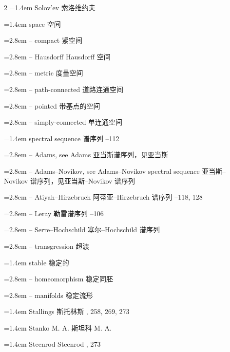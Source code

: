 \begin{multicols}{2}
\noindent\hangindent=1.4em Solov'ev \quad 索洛维约夫 \par
\noindent\hangindent=1.4em space \quad 空间 \quad\par
\noindent\hangindent=2.8em -- compact \quad 紧空间 \par
\noindent\hangindent=2.8em -- Hausdorff \quad Hausdorff 空间 \par
\noindent\hangindent=2.8em -- metric \quad 度量空间 \par
\noindent\hangindent=2.8em -- path-connected \quad 道路连通空间 \par
\noindent\hangindent=2.8em -- pointed \quad 带基点的空间 \par
\noindent\hangindent=2.8em -- simply-connected \quad 单连通空间 \par
\noindent\hangindent=1.4em spectral sequence \quad 谱序列 --112\par
\noindent\hangindent=2.8em -- Adams, see Adams \quad 亚当斯谱序列，见亚当斯 \quad\par
\noindent\hangindent=2.8em -- Adams--Novikov, see Adams--Novikov spectral sequence \quad 亚当斯--Novikov 谱序列，见亚当斯--Novikov 谱序列 \quad\par
\noindent\hangindent=2.8em -- Atiyah--Hirzebruch \quad 阿蒂亚--Hirzebruch 谱序列 --118, 128\par
\noindent\hangindent=2.8em -- Leray \quad 勒雷谱序列 --106\par
\noindent\hangindent=2.8em -- Serre--Hochschild \quad 塞尔--Hochschild 谱序列 \par
\noindent\hangindent=2.8em -- transgression \quad 超渡 \par
\noindent\hangindent=1.4em stable \quad 稳定的 \quad\par
\noindent\hangindent=2.8em -- homeomorphism \quad 稳定同胚 \par
\noindent\hangindent=2.8em -- manifolds \quad 稳定流形 \par
\noindent\hangindent=1.4em Stallings \quad 斯托林斯 , 258, 269, 273\par
\noindent\hangindent=1.4em Stanko M. A. \quad 斯坦科 M. A. \par
\noindent\hangindent=1.4em Steenrod \quad Steenrod , 273\par

\end{multicols}
